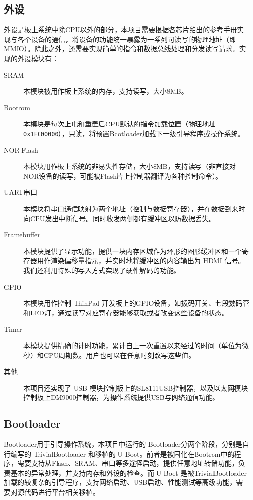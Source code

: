 \subsection{外设}

外设是板上系统中除CPU以外的部分，本项目需要根据各芯片给出的参考手册实现与各个设备的通信，将设备的功能统一暴露为一系列可读写的物理地址（即MMIO）。除此之外，还需要实现简单的指令和数据总线处理和分发读写请求。实现的外设模块有：

\begin{description}

    \item[SRAM] 本模块被用作板上系统的内存，支持读写，大小8MB。
    \item[Bootrom] 本模块是每次上电和重置后CPU默认的指令加载位置（物理地址 \texttt{0x1FC00000}），只读，将预置Bootloader加载下一级引导程序或操作系统。
    \item[NOR Flash] 本模块用作板上系统的非易失性存储，大小8MB，支持读写（非直接对NOR设备的读写，可能被Flash片上控制器翻译为各种控制命令）。
    \item[UART串口] 本模块将串口通信映射为两个地址（控制与数据寄存器），并在数据到来时向CPU发出中断信号。同时收发两侧都有缓冲区以防数据丢失。
    \item[Framebuffer] 本模块提供了显示功能，提供一块内存区域作为环形的图形缓冲区和一个寄存器用作渲染偏移量指示，并实时地将缓冲区的内容输出为 HDMI 信号。我们还利用特殊的写入方式实现了硬件解码的功能。
    \item[GPIO] 本模块用作控制 ThinPad 开发板上的GPIO设备，如拨码开关、七段数码管和LED灯，通过读写对应寄存器能够获取或者改变这些设备的状态。
    \item[Timer] 本模块提供精确的计时功能，累计自上一次重置以来经过的时间（单位为微秒）和CPU周期数。用户也可以在任意时刻改写这些值。
    \item[其他] 本项目还实现了 USB 模块控制板上的SL8111USB控制器，以及以太网模块控制板上DM9000控制器，为操作系统提供USB与网络通信功能。

\end{description}

\subsection{Bootloader}

Bootloader用于引导操作系统，本项目中运行的 Bootloader分两个阶段，分别是自行编写的 TrivialBootloader 和移植的 U-Boot。前者是被固化在Bootrom中的程序，需要支持从Flash、SRAM、串口等多途径启动，提供任意地址转储功能，负责基本的异常处理，并支持内存和外设的检查。而 U-Boot 是被TrivialBootloader加载的较复杂的引导程序，支持网络启动、USB启动、性能测试等高级功能，需要对源代码进行平台相关移植。

